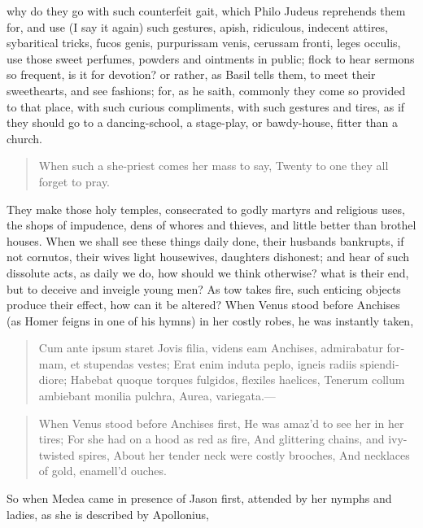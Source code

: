 why do they go with such counterfeit gait, which Philo Judeus
reprehends them for, and use (I say it again) such gestures, apish,
ridiculous, indecent attires, sybaritical tricks, fucos genis,
purpurissam venis, cerussam fronti, leges occulis, \etc{} use those sweet
perfumes, powders and ointments in public; flock to hear sermons so
frequent, is it for devotion? or rather, as Basil tells them, to
meet their sweethearts, and see fashions; for, as he saith, commonly
they come so provided to that place, with such curious compliments,
with such gestures and tires, as if they should go to a dancing-school,
a stage-play, or bawdy-house, fitter than a church.

\begin{verse}%
When such a she-priest comes her mass to say,
Twenty to one they all forget to pray.
\end{verse}%

They make those holy temples, consecrated to godly martyrs and
religious uses, the shops of impudence, dens of whores and thieves, and
little better than brothel houses. When we shall see these things daily
done, their husbands bankrupts, if not cornutos, their wives light
housewives, daughters dishonest; and hear of such dissolute acts, as
daily we do, how should we think otherwise? what is their end, but to
deceive and inveigle young men? As tow takes fire, such enticing
objects produce their effect, how can it be altered? When Venus stood
before Anchises (as Homer feigns in one of his hymns) in her
costly robes, he was instantly taken,

\begin{latin}
\begin{verse}%
Cum ante ipsum staret Jovis filia, videns eam
Anchises, admirabatur formam, et stupendas vestes;
Erat enim induta peplo, igneis radiis spiendidiore;
Habebat quoque torques fulgidos, flexiles haelices,
Tenerum collum ambiebant monilia pulchra,
Aurea, variegata.---
\end{verse}%
\end{latin}
\translationrule%
\begin{verse}%
When Venus stood before Anchises first,
He was amaz'd to see her in her tires;
For she had on a hood as red as fire,
And glittering chains, and ivy-twisted spires,
About her tender neck were costly brooches,
And necklaces of gold, enamell'd ouches.
\end{verse}%

So when Medea came in presence of Jason first, attended by her nymphs
and ladies, as she is described by Apollonius,

